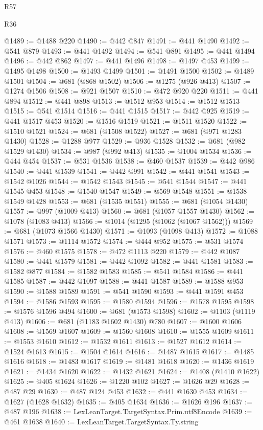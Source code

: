 \begin{lexlean}{R57}
\begin{lexlean}{R36}
\begin{coremodule}
{{{{{{{{{{{{{{{{{{{{{{{{{{{{{{{{{{{{{{{{{{{{{{{{{{{{{{{{{{{{{{{{{{{{{{{{{{{{{{{{{{@1489 := @1488 @220
@1490 := @442 @847
@1491 := @441 @1490
@1492 := @541 @879
@1493 := @441 @1492
@1494 := @541 @891
@1495 := @441 @1494
@1496 := @442 @862
@1497 := @441 @1496
@1498 := @1497 @453
@1499 := @1495 @1498
@1500 := @1493 @1499
@1501 := @1491 @1500
@1502 := @1489 @1501
@1504 := @681 (@868 @1502)
@1506 := @1275 (@926 @413)
@1507 := @1274 @1506
@1508 := @921 @1507
@1510 := @472 @920 @220
@1511 := @441 @894
@1512 := @441 @898
@1513 := @1512 @953
@1514 := @1512 @1513
@1515 := @541 @1514
@1516 := @441 @1515
@1517 := @442 @925
@1519 := @441 @1517 @453
@1520 := @1516 @1519
@1521 := @1511 @1520
@1522 := @1510 @1521
@1524 := @681 (@1508 @1522)
@1527 := @681 (@971 @1283 @1430)
@1528 := @1288 @977
@1529 := @936 @1528
@1532 := @681 (@982 @1529 @1430)
@1534 := @987 (@992 @413)
@1535 := @1004 @1534
@1536 := @444 @454
@1537 := @531 @1536
@1538 := @460 @1537
@1539 := @442 @986
@1540 := @441 @1539
@1541 := @442 @991
@1542 := @441 @1541
@1543 := @1542 @1026
@1544 := @1542 @1543
@1545 := @541 @1544
@1547 := @441 @1545 @453
@1548 := @1540 @1547
@1549 := @569 @1548
@1551 := @1538 @1549 @1428
@1553 := @681 (@1535 @1551)
@1555 := @681 (@1054 @1430)
@1557 := @997 (@1009 @413)
@1560 := @681 (@1057 @1557 @1430)
@1562 := @1078 (@1083 @413)
@1566 := @1014 (@1295 (@1062 (@1067 @1562)))
@1569 := @681 (@1073 @1566 @1430)
@1571 := @1093 (@1098 @413)
@1572 := @1088 @1571
@1573 := @1114 @1572
@1574 := @444 @952
@1575 := @531 @1574
@1576 := @460 @1575
@1578 := @472 @1113 @220
@1579 := @442 @1087
@1580 := @441 @1579
@1581 := @442 @1092
@1582 := @441 @1581
@1583 := @1582 @877
@1584 := @1582 @1583
@1585 := @541 @1584
@1586 := @441 @1585
@1587 := @442 @1097
@1588 := @441 @1587
@1589 := @1588 @953
@1590 := @1588 @1589
@1591 := @541 @1590
@1593 := @441 @1591 @453
@1594 := @1586 @1593
@1595 := @1580 @1594
@1596 := @1578 @1595
@1598 := @1576 @1596 @494
@1600 := @681 (@1573 @1598)
@1602 := @1103 (@1119 @413)
@1606 := @681 (@1183 @1602 @1430) @780
@1607 := @1600 @1606
@1608 := @1569 @1607
@1609 := @1560 @1608
@1610 := @1555 @1609
@1611 := @1553 @1610
@1612 := @1532 @1611
@1613 := @1527 @1612
@1614 := @1524 @1613
@1615 := @1504 @1614
@1616 := @1487 @1615
@1617 := @1485 @1616
@1618 := @1483 @1617
@1619 := @1481 @1618
@1620 := @1436 @1619
@1621 := @1434 @1620
@1622 := @1432 @1621
@1624 := @1408 (@1410 @1622)
@1625 := @405 @1624
@1626 := @1220 @102
@1627 := @1626 @29
@1628 := @487 @29
@1630 := @487 @124 @453
@1632 := @441 @1630 @453
@1634 := @1627 (@1628 @1632)
@1635 := @405 @1634
@1636 := @1626 @196
@1637 := @487 @196
@1638 := LexLeanTarget.TargetSyntax.Prim.utf8Encode
@1639 := @461 @1638
@1640 := LexLeanTarget.TargetSyntax.Ty.string
}}}}}}}}}}}}}}}}}}}}}}}}}}}}}}}}}}}}}}}}}}}}}}}}}}}}}}}}}}}}}}}}}}}}}}}}}}}}}}}}}}
\end{coremodule}
\end{lexlean}
\end{lexlean}
